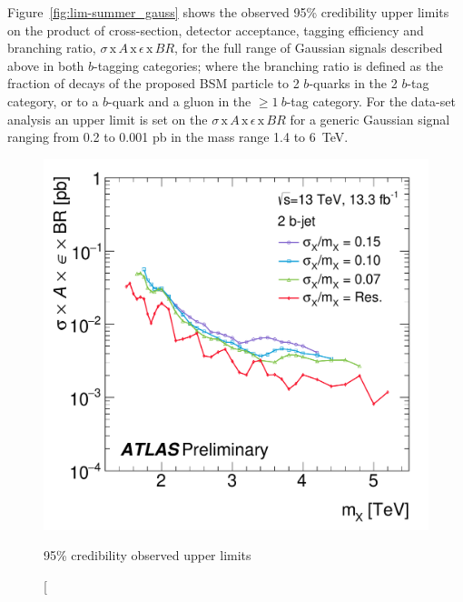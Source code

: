 Figure~\ref{fig:lim-summer_gauss} shows the observed 95\% credibility upper limits
on the product of cross-section, detector acceptance, tagging efficiency and branching ratio,
$\sigma\,\text{x}\,\mathit{A}\,\text{x}\,\epsilon\,\text{x}\,\mathit{BR}$,
for the full range of Gaussian signals described above in both $b$-tagging categories;
where the branching ratio is defined as the fraction of decays of the proposed BSM particle to 2 $b$-quarks in the 2 $b$-tag category,
or to a $b$-quark and a gluon in the $\geq1~b$-tag category.
For the \summer{} data-set analysis an upper limit is set on the $\sigma\,\text{x}\,\mathit{A}\,\text{x}\,\epsilon\,\text{x}\,\mathit{BR}$
for a generic Gaussian signal ranging from 0.2 to 0.001 pb in the mass range 1.4 to 6~TeV.

\begin{figure}[!ht]
  \begin{center}
    \captionsetup[subfigure]{aboveskip=0pt,justification=centering}
         {\includegraphics[width=0.49\linewidth, angle=0]{figs/Dibjet/ICHEP/lim-summer_gauss_bb.pdf}}
  \end{center}
  \vspace{-1em}
  \caption[95\% credibility observed upper limits

\end{figure}
